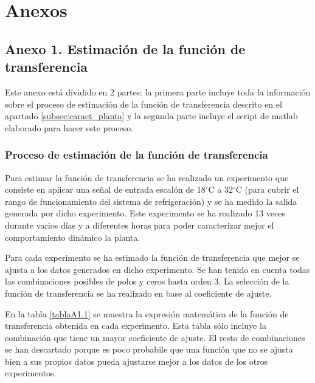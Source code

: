 \chapter{Anexos} \label{Anexos}

\section{Anexo 1. Estimación de la función de transferencia}\label{ftrans}

	Este anexo está dividido en 2 partes: la primera parte incluye toda la información sobre el proceso de estimación de la función de transferencia descrito en el apartado \ref{subsec:caract_planta} y la segunda parte incluye el script de matlab elaborado para hacer este proceso.

\subsection{Proceso de estimación de la función de transferencia}

	Para estimar la función de transferencia se ha realizado un experimento que consiste en aplicar una señal de entrada escalón de 18{$^{\circ}$}C a 32{$^{\circ}$}C (para cubrir el rango de funcionamiento del sistema de refrigeración) y se ha medido la salida generada por dicho experimento. Este experimento se ha realizado 13 veces durante varios días y a diferentes horas para poder caracterizar mejor el comportamiento dinámico la planta.

	Para cada experimento se ha estimado la función de transferencia que mejor se ajusta a los datos generados en dicho experimento. Se han tenido en cuenta todas las combinaciones posibles de polos y ceros hasta orden 3. La selección de la función de transferencia se ha realizado en base al coeficiente de ajuste. 

	En la tabla \ref{tablaA1.1} se muestra la expresión matemática de la función de transferencia obtenida en cada experimento. Esta tabla sólo incluye la combinación que tiene un mayor coeficiente de ajuste. El resto de combinaciones se han descartado porque es poco probabile que una función que no se ajusta bien a sus propios datos pueda ajustarse mejor a los datos de los otros experimentos.

\newpage 

